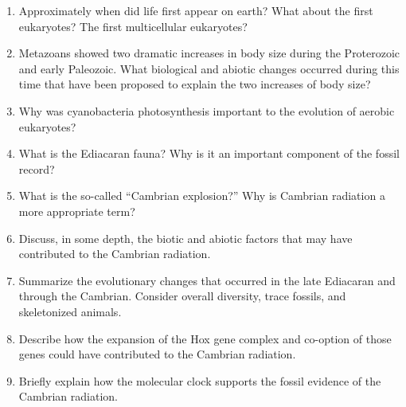 \documentclass[letterpaper]{tufte-handout}
\begin{document}
\begin{enumerate}
	\item Approximately when did life first appear on earth?  What about the first eukaryotes? The first multicellular eukaryotes?

	\item Metazoans showed two dramatic increases in body size during the Proterozoic and early Paleozoic.  What biological and abiotic changes occurred during this time that have been proposed to explain the two increases of body size?

	\item Why was cyanobacteria photosynthesis important to the evolution of aerobic eukaryotes?

	\item What is the Ediacaran fauna?  Why is it an important component of the fossil record?

	\item What is the so-called ``Cambrian explosion?''  Why is Cambrian radiation a more appropriate term?

	\item Discuss, in some depth, the biotic and abiotic factors that may have contributed to the Cambrian radiation.

	\item Summarize the evolutionary changes that occurred in the late Ediacaran and through the Cambrian.  Consider overall diversity, trace fossils, and skeletonized animals.

	\item Describe how the expansion of the Hox gene complex and co-option of those genes could have contributed to the Cambrian radiation.

	\item Briefly explain how the molecular clock supports the fossil evidence of the Cambrian radiation. 

\end{enumerate}
\end{document}
